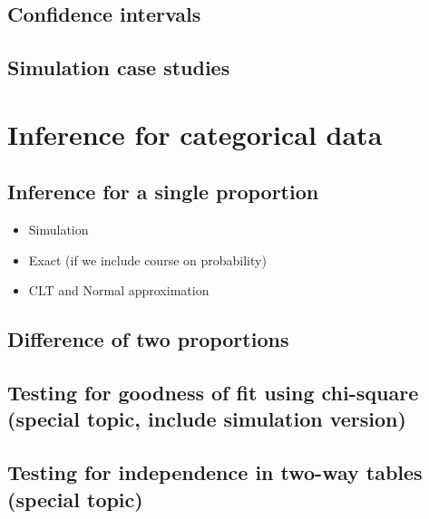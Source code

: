 \documentclass[]{book}
\providecommand{\tightlist}{%
  \setlength{\itemsep}{0pt}\setlength{\parskip}{0pt}}
\begin{document}
\hypertarget{confidence-intervals}{%
\section{Confidence intervals}\label{confidence-intervals}}

\hypertarget{simulation-case-studies}{%
\section{Simulation case studies}\label{simulation-case-studies}}

\hypertarget{inference-cat}{%
\chapter{Inference for categorical data}\label{inference-cat}}

\hypertarget{inference-for-a-single-proportion}{%
\section{Inference for a single proportion}\label{inference-for-a-single-proportion}}

\begin{itemize}
\tightlist
\item
  Simulation
\item
  Exact (if we include course on probability)
\item
  CLT and Normal approximation
\end{itemize}

\hypertarget{difference-of-two-proportions}{%
\section{Difference of two proportions}\label{difference-of-two-proportions}}

\hypertarget{testing-for-goodness-of-fit-using-chi-square-special-topic-include-simulation-version}{%
\section{Testing for goodness of fit using chi-square (special topic, include simulation version)}\label{testing-for-goodness-of-fit-using-chi-square-special-topic-include-simulation-version}}

\hypertarget{testing-for-independence-in-two-way-tables-special-topic}{%
\section{Testing for independence in two-way tables (special topic)}\label{testing-for-independence-in-two-way-tables-special-topic}}
\end{document}
